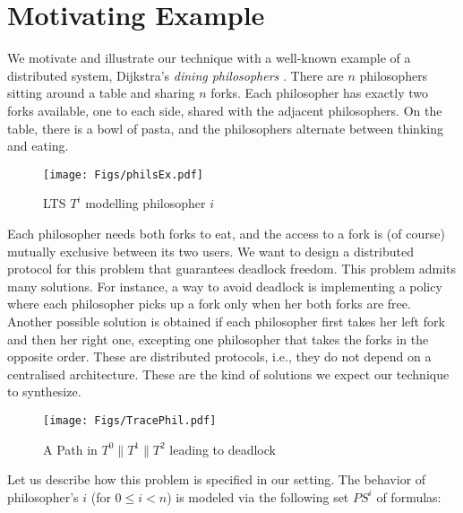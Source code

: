 \section{Motivating Example}\label{sec:motivating-example}
%
\sloppy We motivate and illustrate our technique with a well-known example of  a distributed system, Dijkstra's \emph{dining philosophers} \cite{Dijkstra71}.   There are $n$ philosophers sitting around a table and sharing $n$ forks.  Each philosopher has exactly two forks available, one to each side, shared with the adjacent  philosophers. On the table, there is a bowl of pasta, and the philosophers alternate between thinking and eating.  
\begin{wrapfigure}[17]{r}{.40\textwidth}
 \centering
 \vspace{-0.7cm}
 \texttt{[image: Figs/philsEx.pdf]} %
  \caption{LTS $T^i$ modelling philosopher $i$}\label{fig:philsEx}
\end{wrapfigure}
Each philosopher needs both forks to eat, and the access to a fork is (of course) mutually exclusive between its two users.  We want to design a  distributed protocol for this problem  that guarantees deadlock freedom. %
This problem admits many  solutions. For instance,  a way to avoid deadlock is implementing a policy where each philosopher picks up a fork only when her both forks are free.  Another possible solution is obtained  if  each philosopher first takes her left fork and then her right one,  excepting  one philosopher that takes the forks in the opposite order. These are distributed protocols, i.e., they do not depend on a centralised architecture. These are the kind of solutions we expect our technique to synthesize. 
\begin{wrapfigure}[25]{hr}{.25\textwidth}
    \vspace{-0.7cm}
    \texttt{[image: Figs/TracePhil.pdf]} %
    \caption{A Path in $T^0 \parallel T^1 \parallel T^2$ leading to deadlock}\label{fig:philsTrace}
\end{wrapfigure}
Let us describe how this problem is specified in our setting.  The behavior of  philosopher's $i$ (for $0 \leq i < n$) is modeled  via the following set $\mathit{PS}^i$ of formulas:
